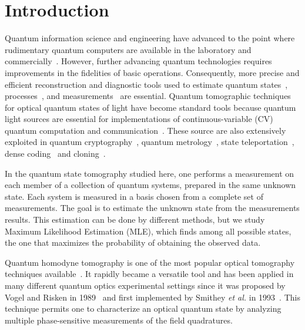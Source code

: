 \documentclass[
reprint,
superscriptaddress,
showpacs,
amsmath,
amssymb,
aps,
pra,
longbibliography
]{revtex4-1}
\begin{document}

\section{Introduction}
\label{intro}
Quantum information science and engineering have
  advanced to the point where rudimentary quantum computers are
available in the laboratory and commercially~\cite{kandala2017,
  Linke2017, Monk2017, Denchev2016}.  However, further advancing
quantum technologies requires improvements in the fidelities of basic
operations.  Consequently, more precise and efficient reconstruction
and diagnostic tools used to estimate quantum states~\cite{Vogel1989,
  Smithey1993, Dunn1995, Banaszek1999, Banaszek2000, White2002,
  Ourjoumtsev2007, Neergaard2006}, processes~\cite{Chuang1997,
  Poyatos1997, Altepeter2003, Dariano1998, Nielsen1998, Mitchell2003,
  Obrien2004,Kupchak2015}, and measurements~\cite{Luis1999,
  Fiurasek2001, Dariano2004, Lundeen2009} are essential. Quantum tomographic techniques for optical quantum states of light have become 
standard tools because quantum light sources are essential for
implementations of continuous-variable (CV) quantum computation
and communication~\cite{Lloyd1999, Gottesman2001, Bartlett2002,
  Jeong2002, Ralph2003}.  These source are also extensively exploited
in quantum cryptography~\cite{Ralph1999, Hillery2000, Silberhorn2002,
  Pirandola2008, Luiz2017}, quantum metrology~\cite{Eberle2010,
  Demkowicz2013}, state teleportation~\cite{Vaidman1994,
  Braunstein1998, He2015}, dense coding~\cite{Braunstein2000, Lee2014}
and cloning~\cite{Cerf2000, Braunstein2001}.

In the quantum state tomography studied here,
one performs a measurement on each member of a collection
of quantum systems, prepared in the same unknown state. Each
  system is measured in a basis chosen from a complete set of
  measurements. The goal is to estimate the unknown state from the
measurements results.  This estimation can be done by different
methods, but we study Maximum Likelihood Estimation (MLE), which finds
among all possible states, the one that maximizes the probability of
obtaining the observed data.

Quantum homodyne tomography is one of the most popular optical
tomography techniques available~\cite{Lvovsky2004}. It rapidly became
a versatile tool and has been applied in many different quantum optics
experimental settings since it was proposed by Vogel and Risken in
1989~\cite{Vogel1989} and first implemented by Smithey \textit{et al.}
in 1993~\cite{Smithey1993}. This technique permits one to characterize
an optical quantum state by analyzing multiple phase-sensitive
measurements of the field quadratures.
\end{document}
